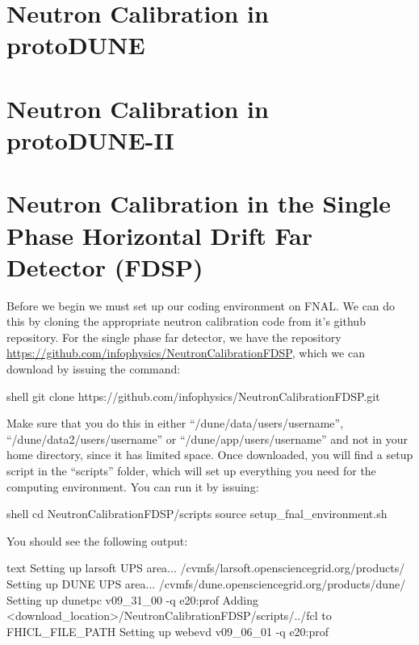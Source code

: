\documentclass[8pt]{refart}
\begin{document}
\section{Neutron Calibration in protoDUNE}

\section{Neutron Calibration in protoDUNE-II}

\section{Neutron Calibration in the Single Phase Horizontal Drift Far Detector (FDSP)}

Before we begin we must set up our coding environment on FNAL.  We can do this by cloning the appropriate neutron calibration code from it's github repository.  For the single phase far detector, we have the repository \url{https://github.com/infophysics/NeutronCalibrationFDSP}, which we can download by issuing the command:
\begin{code}{shell}
git clone https://github.com/infophysics/NeutronCalibrationFDSP.git
\end{code}
Make sure that you do this in either ``/dune/data/users/username'', ``/dune/data2/users/username'' or ``/dune/app/users/username'' and not in your home directory, since it has limited space.  Once downloaded, you will find a setup script in the ``scripts'' folder, which will set up everything you need for the computing environment.  You can run it by issuing:
\begin{code}{shell}
cd NeutronCalibrationFDSP/scripts
source setup_fnal_environment.sh
\end{code}
You should see the following output:
\begin{code}{text}
Setting up larsoft UPS area... /cvmfs/larsoft.opensciencegrid.org/products/
Setting up DUNE UPS area... /cvmfs/dune.opensciencegrid.org/products/dune/
Setting up dunetpc v09_31_00 -q e20:prof
Adding <download_location>/NeutronCalibrationFDSP/scripts/../fcl to FHICL_FILE_PATH
Setting up webevd v09_06_01 -q e20:prof
\end{code}
\end{document}
